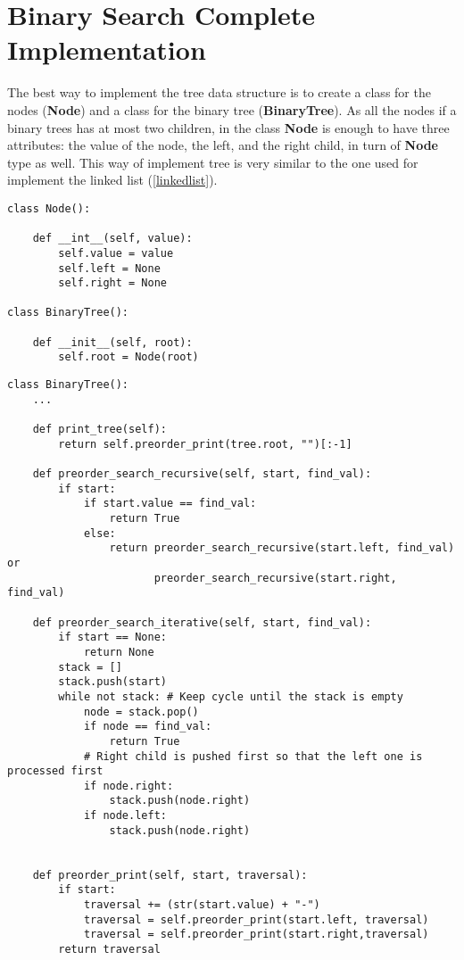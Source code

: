 \chapter{Binary Search Complete Implementation}
\label{binappendix}
The best way to implement the tree data structure is to create a class for the nodes (\textbf{Node}) and a class for the binary tree (\textbf{BinaryTree}). As all the nodes if a binary trees has at most two children, in the class \textbf{Node} is enough to have three attributes: the value of the node, the left, and the right child, in turn of \textbf{Node} type as well. This way of implement tree is very similar to the one used for implement the linked list (\ref{linkedlist}).

\begin{lstlisting}[firstnumber=1, caption={Class definition for a node and a tree}]
class Node():

	def __int__(self, value):
		self.value = value
		self.left = None
		self.right = None

class BinaryTree():

	def __init__(self, root):
		self.root = Node(root)
\end{lstlisting}

\begin{lstlisting}[firstnumber=1, caption={Tree operations implementation}]
class BinaryTree():
	...
	
	def print_tree(self):
		return self.preorder_print(tree.root, "")[:-1]
	
	def preorder_search_recursive(self, start, find_val):
		if start:
			if start.value == find_val:
				return True
			else:
				return preorder_search_recursive(start.left, find_val) or
					   preorder_search_recursive(start.right, find_val)
	
	def preorder_search_iterative(self, start, find_val):
		if start == None:
			return None
		stack = []
		stack.push(start)
		while not stack: # Keep cycle until the stack is empty
			node = stack.pop()
			if node == find_val:
				return True
			# Right child is pushed first so that the left one is processed first
			if node.right:
				stack.push(node.right)
			if node.left:
				stack.push(node.right)
		
		
	def preorder_print(self, start, traversal):
		if start:
			traversal += (str(start.value) + "-")
			traversal = self.preorder_print(start.left, traversal)
			traversal = self.preorder_print(start.right,traversal)
		return traversal
\end{lstlisting}